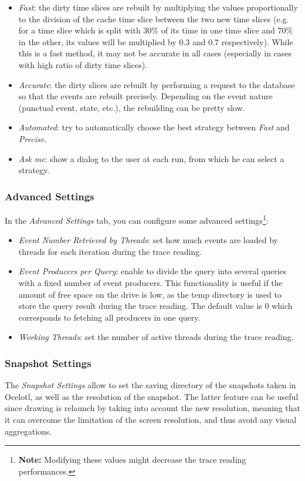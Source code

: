 \documentclass[twoside]{article}
\begin{document}
\begin{sloppypar}
\begin{itemize}
	\begin{itemize}
		\item \textit{Fast}: the dirty time slices are rebuilt by multiplying the values proportionally to the division of the cache time slice between the two new time slices (e.g. for a time slice which is split with 30\% of its time in one time slice and 70\% in the other, its values will be multiplied by 0.3 and 0.7 respectively). While this is a fast method, it may not be accurate in all cases (especially in cases with high ratio of dirty time slices).
		\item \textit{Accurate}: the dirty slices are rebuilt by performing a request to the database so that the events are rebuilt precisely. Depending on the event nature (punctual event, state, etc.), the rebuilding can be pretty slow.
		\item \textit{Automated}: try to automatically choose the best strategy between \textit{Fast} and \textit{Precise}. 
		\item \textit{Ask me}: show a dialog to the user at each run, from which he can select a strategy.
	\end{itemize}   
\end{itemize} 

\subsubsection{Advanced Settings}
In the \textit{Advanced Settings} tab, you can configure some advanced settings\footnote{\textbf{Note:} Modifying these values might decrease the trace reading performances.}:
\begin{itemize}
	\item \textit{Event Number Retrieved by Threads}: set how much events are loaded by threads for each iteration during the trace reading.
	\item \textit{Event Producers per Query}: enable to divide the query into several queries with a fixed number of event producers. This functionality is useful if the amount of free space on the drive is low, as the temp directory is used to store the query result during the trace reading. The default value is 0 which corresponds to fetching all producers in one query.
	\item \textit{Working Threads}: set the number of active threads during the trace reading. 
\end{itemize}

\subsubsection{Snapshot Settings}
The \textit{Snapshot Settings} allow to set the saving directory of the snapshots taken in Ocelotl, as well as the resolution of the snapshot. The latter feature can be useful since drawing is relaunch by taking into account the new resolution, meaning that it can overcome the limitation of the screen resolution, and thus avoid any visual aggregations.


\end{sloppypar}
\end{document}
